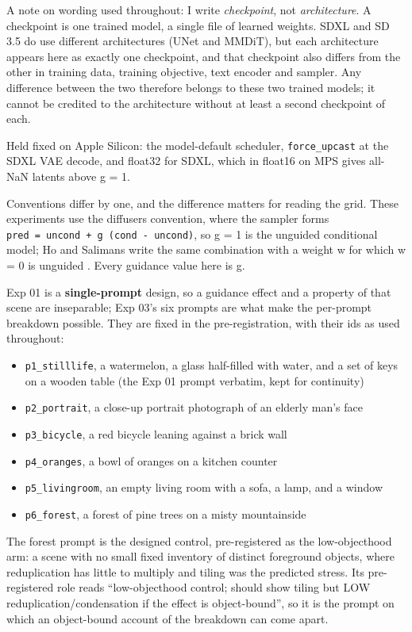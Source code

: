\documentclass[11pt]{article}
\providecommand{\tightlist}{\setlength{\itemsep}{0pt}\setlength{\parskip}{0pt}}
\begin{document}
A note on wording used throughout: I write \emph{checkpoint}, not
\emph{architecture}. A checkpoint is one trained model, a single file of learned
weights. SDXL and SD 3.5 do use different architectures (UNet and MMDiT), but
each architecture appears here as exactly one checkpoint, and that checkpoint
also differs from the other in training data, training objective, text encoder
and sampler. Any difference between the two therefore belongs to these two
trained models; it cannot be credited to the architecture without at least a
second checkpoint of each.

Held fixed on Apple Silicon: the model-default scheduler, \texttt{force\_upcast}
at the SDXL VAE decode, and float32 for SDXL, which in float16 on MPS gives
all-NaN latents above g = 1.

Conventions differ by one, and the difference matters for reading the grid.
These experiments use the diffusers convention, where the sampler forms
\texttt{pred\ =\ uncond\ +\ g\ (cond\ -\ uncond)}, so g = 1 is the unguided
conditional model; Ho and Salimans write the same combination with a weight w
for which w = 0 is unguided \citep{ho2022cfg}. Every guidance value here is g.

Exp 01 is a \textbf{single-prompt} design, so a guidance effect and a property
of that scene are inseparable; Exp 03's six prompts are what make the per-prompt
breakdown possible. They are fixed in the pre-registration, with their ids as
used throughout:

\begin{itemize}
\tightlist
\item
  \texttt{p1\_stilllife}, a watermelon, a glass half-filled with water, and a
  set of keys on a wooden table (the Exp 01 prompt verbatim, kept for
  continuity)
\item
  \texttt{p2\_portrait}, a close-up portrait photograph of an elderly man's face
\item
  \texttt{p3\_bicycle}, a red bicycle leaning against a brick wall
\item
  \texttt{p4\_oranges}, a bowl of oranges on a kitchen counter
\item
  \texttt{p5\_livingroom}, an empty living room with a sofa, a lamp, and a
  window
\item
  \texttt{p6\_forest}, a forest of pine trees on a misty mountainside
\end{itemize}

The forest prompt is the designed control, pre-registered as the low-objecthood
arm: a scene with no small fixed inventory of distinct foreground objects, where
reduplication has little to multiply and tiling was the predicted stress. Its
pre-registered role reads ``low-objecthood control; should show tiling but LOW
reduplication/condensation if the effect is object-bound'', so it is the prompt
on which an object-bound account of the breakdown can come apart.
\end{document}
